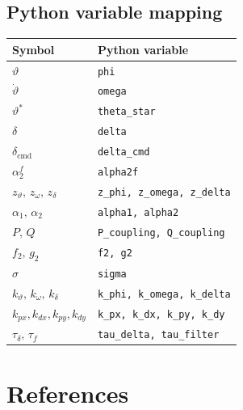 \documentclass[11pt,a4paper]{article}
\theoremstyle{plain}
\theoremstyle{remark}
\newcommand{\vth}{\vartheta}
\newcommand{\vths}{\vartheta^*}
\newcommand{\zth}{z_{\vth}}
\newcommand{\zom}{z_{\omega}}
\newcommand{\zdel}{z_{\delta}}
\newcommand{\dcmd}{\delta_{\mathrm{cmd}}}
\begin{document}
\subsection*{Python variable mapping}

\begin{center}
\begin{tabular}{ll}
\toprule
Symbol & Python variable \\
\midrule
$\vth$ & \texttt{phi} \\
$\dot\vth$ & \texttt{omega} \\
$\vths$ & \texttt{theta\_star} \\
$\delta$ & \texttt{delta} \\
$\dcmd$ & \texttt{delta\_cmd} \\
$\alpha_2^f$ & \texttt{alpha2f} \\
$\zth,\, \zom,\, \zdel$ & \texttt{z\_phi, z\_omega, z\_delta} \\
$\alpha_1,\, \alpha_2$ & \texttt{alpha1, alpha2} \\
$P,\, Q$ & \texttt{P\_coupling, Q\_coupling} \\
$f_2,\, g_2$ & \texttt{f2, g2} \\
$\sigma$ & \texttt{sigma} \\
$k_\vth,\, k_\omega,\, k_\delta$ & \texttt{k\_phi, k\_omega, k\_delta} \\
$k_{px}, k_{dx}, k_{py}, k_{dy}$ & \texttt{k\_px, k\_dx, k\_py, k\_dy} \\
$\tau_\delta,\, \tau_f$ & \texttt{tau\_delta, tau\_filter} \\
\bottomrule
\end{tabular}
\end{center}

\section*{References}
\end{document}
